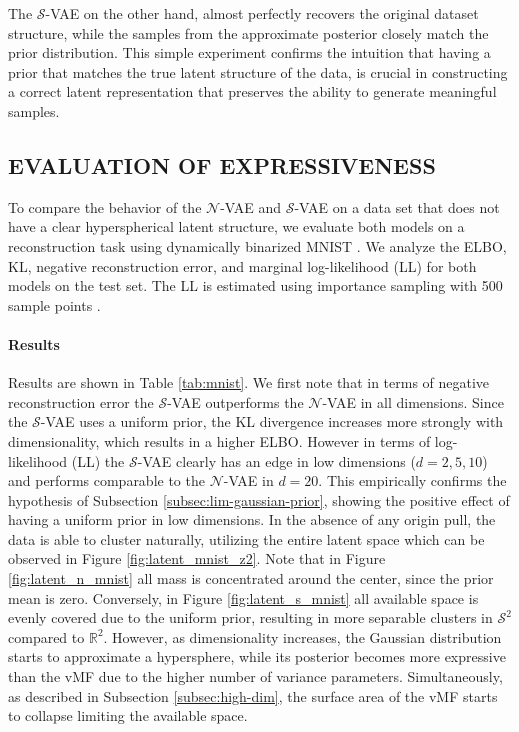 \documentclass[letterpaper]{article}
\newcommand{\Sv}{$\mathcal{S}$}
\newcommand{\Nv}{$\mathcal{N}$}
\begin{document}
The \Sv-VAE on the other hand, almost perfectly recovers the original dataset structure, while the samples from the approximate posterior closely match the prior distribution. This simple experiment confirms the intuition that having a prior that matches the true latent structure of the data, is crucial in constructing a correct latent representation that preserves the ability to generate meaningful samples. 

\subsection{EVALUATION OF EXPRESSIVENESS} \label{subsec:mnist}
To compare the behavior of the $\mathcal{N}$-VAE and $\mathcal{S}$-VAE on a data set that does not have a clear hyperspherical latent structure, we evaluate both models on a reconstruction task using dynamically binarized MNIST \citep{salakhutdinov2008quantitative}. We analyze the ELBO, KL, negative reconstruction error, and marginal log-likelihood (LL) for both models on the test set. The LL is estimated using importance sampling with 500 sample points \citep{burda2015importance}.

\paragraph{Results}
Results are shown in Table \ref{tab:mnist}. We first note that in terms of negative reconstruction error the \Sv-VAE outperforms the \Nv-VAE in all dimensions. Since the \Sv-VAE uses a uniform prior, the KL divergence increases more strongly with dimensionality, which results in a higher ELBO. However in terms of log-likelihood (LL) the \Sv-VAE clearly has an edge in low dimensions ($d = 2,5,10$) and performs comparable to the \Nv-VAE in $d=20$. This empirically confirms the hypothesis of Subsection \ref{subsec:lim-gaussian-prior}, showing the positive effect of having a uniform prior in low dimensions. In the absence of any origin pull, the data is able to cluster naturally, utilizing the entire latent space which can be observed in Figure \ref{fig:latent_mnist_z2}. Note that in Figure \ref{fig:latent_n_mnist} all mass is concentrated around the center, since the prior mean is zero. Conversely, in Figure \ref{fig:latent_s_mnist} all available space is evenly covered due to the uniform prior, resulting in more separable clusters in $\mathcal{S}^2$ compared to $\mathbb{R}^2$. However, as dimensionality increases, the Gaussian distribution starts to approximate a hypersphere, while its posterior becomes more expressive than the vMF due to the higher number of variance parameters. Simultaneously, as described in Subsection \ref{subsec:high-dim}, the surface area of the vMF starts to collapse limiting the available space.
\end{document}
